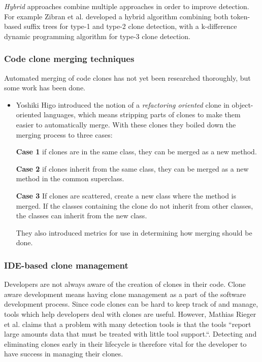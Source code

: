 \documentclass[12pt]{article}
\begin{document}
\textit{Hybrid} approaches combine multiple approaches in order to improve detection. For
example Zibran et al.\cite{Zibran_real_time_search} developed a hybrid algorithm
combining both token-based suffix trees for type-1 and type-2 clone detection, with
a k-difference dynamic programming algorithm for type-3 clone detection. 

\subsubsection{Code clone merging techniques}

Automated merging of code clones has not yet been researched thoroughly, but some work has
been done.

\begin{itemize}
    \item 
Yoshiki Higo\cite{RefactoringOrientedClonesAndMerging} introduced the notion of a
\textit{refactoring oriented} clone in object-oriented languages, which means stripping
parts of clones to make them easier to automatically merge. With these clones they boiled
down the merging process to three cases:

\textbf{Case 1} if clones are in the same class, they can be merged as a new method.

\textbf{Case 2} if clones inherit from the same class, they can be merged as a new
method in the common superclass.

\textbf{Case 3} If clones are scattered, create a new class where the method is merged. If
the classes containing the clone do not inherit from other classes, the classes can
inherit from the new class.

They also introduced metrics for use in determining how merging should be done.
\end{itemize}

\subsubsection{IDE-based clone management}

Developers are not always aware of the creation of clones in their code. Clone aware
development means having clone management as a part of the software development
process. Since code clones can be hard to keep track of and manage, tools which help
developers deal with clones are useful. However, Mathias Rieger et al. claims that
a problem with many detection tools is that the tools ``report large amounts data that must
be treated with little tool support.``\cite[1]{InsightsSystemWideDuplication}. Detecting
and eliminating clones early in their lifecycle is therefore vital for the developer to
have success in managing their clones.
\end{document}

